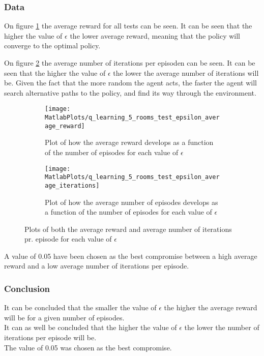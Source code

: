 \documentclass[../Head/Main.tex]{subfiles}
\begin{document}
\clearpage
\subsubsection{Data}
On figure \ref{fig:q-learn_epsilon_reward} the average reward for all tests can be seen. It can be seen that the higher the value of $\epsilon$ the lower average reward, meaning that the policy will converge to the optimal policy.\par
On figure \ref{fig:q-learn_epsilon_iterations} the average number of iterations per episoden can be seen. It can be seen that the higher the value of $\epsilon$ the lower the average number of iterations will be. Given the fact that the more random the agent acts, the faster the agent will search alternative paths to the policy, and find its way through the environment.  
\begin{figure}[H]
	\centering
	\begin{subfigure}[b]{0.49\textwidth}
		\centering
		\texttt{[image: MatlabPlots/q\_learning\_5\_rooms\_test\_epsilon\_average\_reward]}
		\caption{Plot of how the average reward develops as a function of the number of episodes for each value of $\epsilon$}
		\label{fig:q-learn_epsilon_reward}
	\end{subfigure}
	\hfill
	\begin{subfigure}[b]{0.49\textwidth}
		\centering
		\texttt{[image: MatlabPlots/q\_learning\_5\_rooms\_test\_epsilon\_average\_iterations]}
		\caption{Plot of how the average number of episodes develops as a function of the number of episodes for each value of $\epsilon$}
		\label{fig:q-learn_epsilon_iterations}
	\end{subfigure}
	\caption{Plots of both the average reward and average number of iterations pr. episode for each value of $\epsilon$}
	\label{fig:q-learn_epsilon}
\end{figure}
A value of 0.05 have been chosen as the best compromise between a high average reward and a low average number of iterations per episode.

\subsubsection{Conclusion}
It can be concluded that the smaller the value of $\epsilon$ the higher the average reward will be for a given number of episodes.\\
It can as well be concluded that the higher the value of $\epsilon$ the lower the number of iterations per episode will be.\\ 
The value of 0.05 was chosen as the best compromise.
\end{document}
